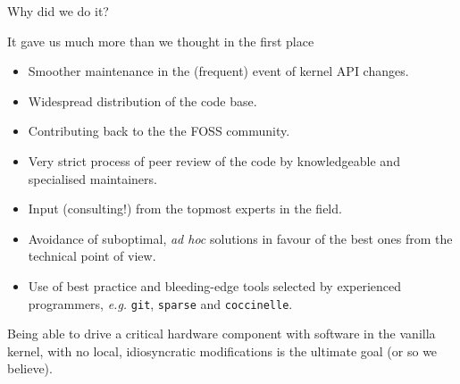 \documentclass{beamer}
\begin{document}
\begin{frame}{Why did we do it?}

It gave us much more than we thought in the first place
\begin{itemize}
\item Smoother maintenance in the (frequent) event of kernel API
  changes.
\item Widespread distribution of the code base.
\item Contributing back to the the FOSS community.
\item Very strict process of peer review of the code by knowledgeable
    and specialised maintainers.
\item Input (consulting!) from the topmost experts in the field.
\item Avoidance of suboptimal, \emph{ad hoc} solutions in favour of the
    best ones from the technical point of view.
\item Use of best practice and bleeding-edge tools selected by
    experienced programmers, \emph{e.g.} \texttt{git}, \texttt{sparse}
    and \texttt{coccinelle}.
\end{itemize}
    Being able to drive a critical hardware component with software
    in the vanilla kernel, with no local, idiosyncratic modifications
    is the ultimate goal (or so we believe).
\end{frame}
\end{document}
